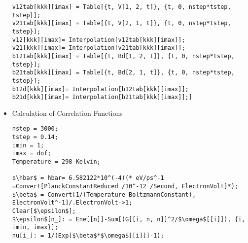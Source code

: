 \begin{itemize}[leftmargin = *]
\begin{lstlisting}
v12tab[kkk][imax] = Table[{t, V[1, 2, t]}, {t, 0, nstep*tstep, tstep}];
v21tab[kkk][imax] = Table[{t, V[2, 1, t]}, {t, 0, nstep*tstep, tstep}];
v12[kkk][imax]= Interpolation[v12tab[kkk][imax]];
v21[kkk][imax]= Interpolation[v21tab[kkk][imax]];
b12tab[kkk][imax] = Table[{t, Bd[1, 2, t]}, {t, 0, nstep*tstep, tstep}];
b21tab[kkk][imax] = Table[{t, Bd[2, 1, t]}, {t, 0, nstep*tstep, tstep}];
b12d[kkk][imax]= Interpolation[b12tab[kkk][imax]];
b21d[kkk][imax]= Interpolation[b21tab[kkk][imax]];]
\end{lstlisting}
\item Calculation of Correlation Functions
\begin{lstlisting}
nstep = 3000;
tstep = 0.14;
imin = 1;
imax = dof;
Temperature = 298 Kelvin;

$\hbar$ = hbar= 6.582122*10^(-4)(* eV/ps^-1 =Convert[PlanckConstantReduced /10^-12 /Second, ElectronVolt]*);
$\beta$ = Convert[1/(Temperature BoltzmannConstant), ElectronVolt^-1]/.ElectronVolt->1;
Clear[$\epsilon$];
$\epsilon$[n_]: = Ene[[n]]-Sum[(G[[i, n, n]]^2/$\omega$[[i]]), {i, imin, imax}];
nu[i_]: = 1/(Exp[$\beta$*$\omega$[[i]]]-1);


\end{lstlisting}
\end{itemize}
